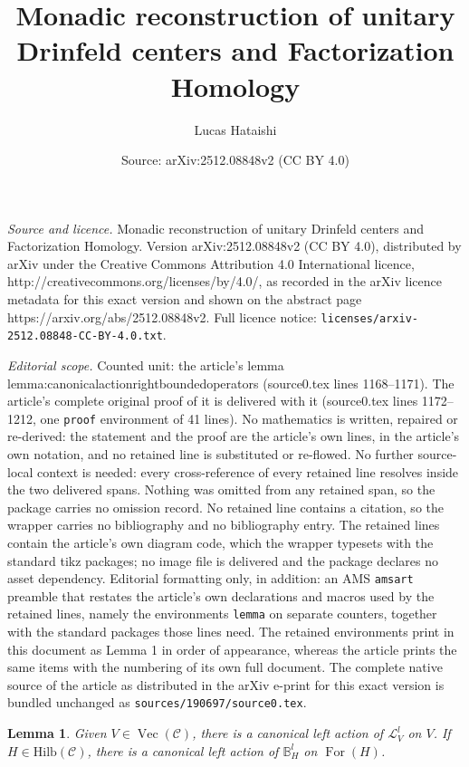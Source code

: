 \documentclass[10pt,a4paper]{amsart}
\title{Monadic reconstruction of unitary Drinfeld centers and Factorization Homology}
\author{Lucas Hataishi}
\date{Source: arXiv:2512.08848v2 (CC BY 4.0)}
\newtheorem{lemma}{Lemma}
\DeclareMathOperator{\For}{For}
\newcommand{\Hilb}{\mathrm{Hilb}}
\DeclareMathOperator{\Vect}{Vec}
\newcommand{\bB}{\mathbb B}
\newcommand{\cC}{\mathcal C}
\newcommand{\cL}{\mathcal L}
\begin{document}
\maketitle

\noindent\emph{Source and licence.} Monadic reconstruction of unitary Drinfeld centers and Factorization Homology. Version arXiv:2512.08848v2 (CC BY 4.0), distributed by arXiv under the Creative Commons Attribution 4.0 International licence, http://creativecommons.org/licenses/by/4.0/, as recorded in the arXiv licence metadata for this exact version and shown on the abstract page https://arxiv.org/abs/2512.08848v2. Full licence notice: \texttt{licenses/arxiv-2512.08848-CC-BY-4.0.txt}.\par\smallskip

\noindent\textit{Editorial scope.} Counted unit: the article's lemma lemma:canonicalactionrightboundedoperators (source0.tex lines 1168--1171). The article's complete original proof of it is delivered with it (source0.tex lines 1172--1212, one \texttt{proof} environment of 41 lines). No mathematics is written, repaired or re-derived: the statement and the proof are the article's own lines, in the article's own notation, and no retained line is substituted or re-flowed.  No further source-local context is needed: every cross-reference of every retained line resolves inside the two delivered spans.  Nothing was omitted from any retained span, so the package carries no omission record.  No retained line contains a citation, so the wrapper carries no bibliography and no bibliography entry.  The retained lines contain the article's own diagram code, which the wrapper typesets with the standard tikz packages; no image file is delivered and the package declares no asset dependency.  Editorial formatting only, in addition: an AMS \texttt{amsart} preamble that restates the article's own declarations and macros used by the retained lines, namely the environments \texttt{lemma} on separate counters, together with the standard packages those lines need.  The retained environments print in this document as Lemma 1 in order of appearance, whereas the article prints the same items with the numbering of its own full document.  The complete native source of the article as distributed in the arXiv e-print for this exact version is bundled unchanged as \texttt{sources/190697/source0.tex}.
\begin{lemma}
    Given $V \in \Vect(\cC)$, there is a canonical left action of $\cL_V^l$ on $V$. If $H \in \Hilb(\cC)$, there is a canonical left action of $\bB^l_H$ on $\For(H)$.
    \label{lemma:canonicalactionrightboundedoperators}
\end{lemma}
\end{document}
